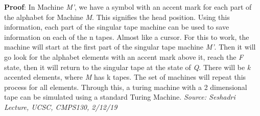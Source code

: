 \documentclass{article}
\begin{document}
\begin{compactenum}
\medskip
\textbf{Proof}: In Machine \emph {M'}, we have a symbol with an accent mark for each part of the alphabet for Machine \emph{M}. This signifies the head position. Using this information, each part of the singular tape machine can be used to save information on each of the n tapes. Almost like a cursor. For this to work, the machine will start at the first part of the singular tape machine \emph{M'}. Then it will go look for the alphabet elements with an accent mark above it, reach the \emph{F} state, then it will return to the singular tape at the state of \emph{Q}. There will be \emph {k} accented elements, where \emph{M} has k tapes.  The set of machines will repeat this process for all elements. Through this, a turing machine with a 2 dimensional tape can be simulated using a standard Turing Machine. 
\emph {Source: Seshadri Lecture, UCSC, CMPS130, 2/12/19}

\end{compactenum}
\end{document}
